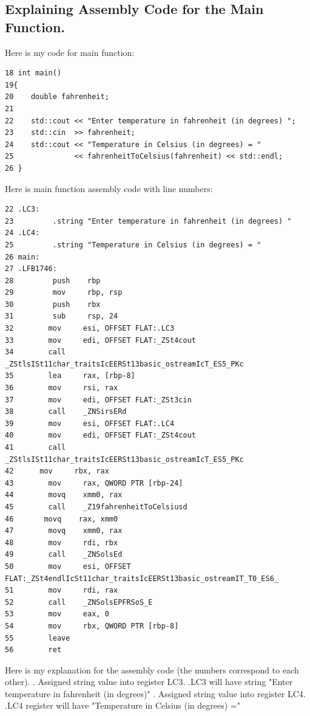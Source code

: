 \documentclass{article}
\theoremstyle{theorem}
\theoremstyle{definition}
\theoremstyle{remark}
\begin{document}
\subsection{Explaining Assembly Code for the Main Function.}
Here is my code for main function:
\begin{lstlisting}
18 int main()
19{
20    double fahrenheit; 
21
22    std::cout << "Enter temperature in fahrenheit (in degrees) ";
23    std::cin  >> fahrenheit;
24    std::cout << "Temperature in Celsius (in degrees) = "
25              << fahrenheitToCelsius(fahrenheit) << std::endl;
26 }
\end{lstlisting}
 Here is main function assembly code with line numbers:
\begin{lstlisting}
22 .LC3:
23         .string "Enter temperature in fahrenheit (in degrees) "
24 .LC4:
25         .string "Temperature in Celsius (in degrees) = "
26 main:
27 .LFB1746:
28         push    rbp
29         mov     rbp, rsp
30         push    rbx
31         sub     rsp, 24
32        mov     esi, OFFSET FLAT:.LC3
33        mov     edi, OFFSET FLAT:_ZSt4cout
34        call    _ZStlsISt11char_traitsIcEERSt13basic_ostreamIcT_ES5_PKc
35        lea     rax, [rbp-8]
36        mov     rsi, rax
37        mov     edi, OFFSET FLAT:_ZSt3cin
38        call    _ZNSirsERd
39        mov     esi, OFFSET FLAT:.LC4
40        mov     edi, OFFSET FLAT:_ZSt4cout
41        call    _ZStlsISt11char_traitsIcEERSt13basic_ostreamIcT_ES5_PKc
42	    mov     rbx, rax
43        mov     rax, QWORD PTR [rbp-24]
44        movq    xmm0, rax
45        call    _Z19fahrenheitToCelsiusd
46       movq    rax, xmm0
47        movq    xmm0, rax
48        mov     rdi, rbx
49        call    _ZNSolsEd
50        mov     esi, OFFSET FLAT:_ZSt4endlIcSt11char_traitsIcEERSt13basic_ostreamIT_T0_ES6_
51        mov     rdi, rax
52        call    _ZNSolsEPFRSoS_E
53        mov     eax, 0
54        mov     rbx, QWORD PTR [rbp-8]
55        leave
56        ret
\end{lstlisting}
Here is my explanation for the assembly code (the numbers correspond to each other).
\newline {}. Assigned string value into register LC3.
\newline .LC3 will have string "Enter temperature in fahrenheit (in degrees)"
\newline {}. Assigned string value into register LC4.
\newline .LC4 register will have "Temperature in Celsius (in degrees) ="
\end{document}
